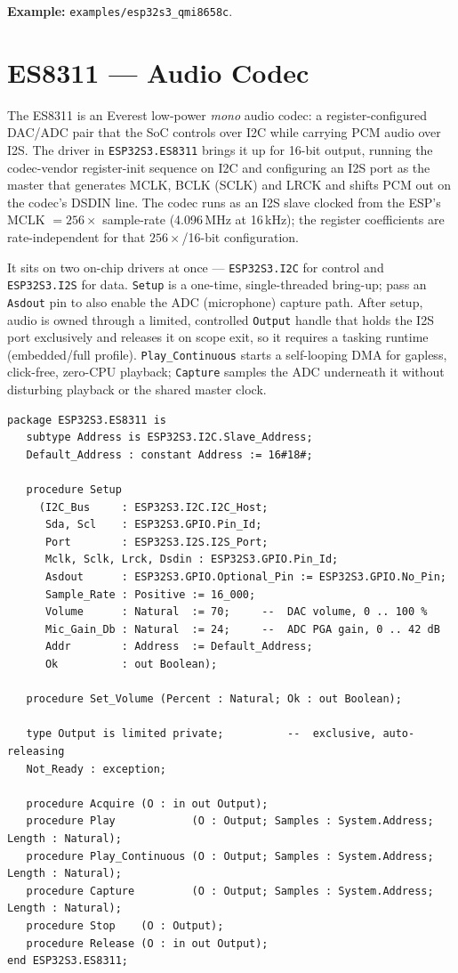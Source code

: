 \noindent\textbf{Example:} \texttt{examples/esp32s3\_qmi8658c}.

\section{ES8311 --- Audio Codec}
\label{app:ext:es8311}

The ES8311 is an Everest low-power \emph{mono} audio codec: a register-configured
DAC/ADC pair that the SoC controls over I2C while carrying PCM audio over I2S. The
driver in \texttt{ESP32S3.ES8311} brings it up for 16-bit output, running the
codec-vendor register-init sequence on I2C and configuring an I2S port as the
master that generates MCLK, BCLK (SCLK) and LRCK and shifts PCM out on the codec's
DSDIN line. The codec runs as an I2S slave clocked from the ESP's MCLK $= 256
\times$ sample-rate (4.096\,MHz at 16\,kHz); the register coefficients are
rate-independent for that $256\times$/16-bit configuration.

It sits on two on-chip drivers at once --- \texttt{ESP32S3.I2C} for control and
\texttt{ESP32S3.I2S} for data. \texttt{Setup} is a one-time, single-threaded
bring-up; pass an \texttt{Asdout} pin to also enable the ADC (microphone) capture
path. After setup, audio is owned through a limited, controlled \texttt{Output}
handle that holds the I2S port exclusively and releases it on scope exit, so it
requires a tasking runtime (embedded/full profile). \texttt{Play\_Continuous}
starts a self-looping DMA for gapless, click-free, zero-CPU playback;
\texttt{Capture} samples the ADC underneath it without disturbing playback or the
shared master clock.

\begin{lstlisting}
package ESP32S3.ES8311 is
   subtype Address is ESP32S3.I2C.Slave_Address;
   Default_Address : constant Address := 16#18#;

   procedure Setup
     (I2C_Bus     : ESP32S3.I2C.I2C_Host;
      Sda, Scl    : ESP32S3.GPIO.Pin_Id;
      Port        : ESP32S3.I2S.I2S_Port;
      Mclk, Sclk, Lrck, Dsdin : ESP32S3.GPIO.Pin_Id;
      Asdout      : ESP32S3.GPIO.Optional_Pin := ESP32S3.GPIO.No_Pin;
      Sample_Rate : Positive := 16_000;
      Volume      : Natural  := 70;     --  DAC volume, 0 .. 100 %
      Mic_Gain_Db : Natural  := 24;     --  ADC PGA gain, 0 .. 42 dB
      Addr        : Address  := Default_Address;
      Ok          : out Boolean);

   procedure Set_Volume (Percent : Natural; Ok : out Boolean);

   type Output is limited private;          --  exclusive, auto-releasing
   Not_Ready : exception;

   procedure Acquire (O : in out Output);
   procedure Play            (O : Output; Samples : System.Address; Length : Natural);
   procedure Play_Continuous (O : Output; Samples : System.Address; Length : Natural);
   procedure Capture         (O : Output; Samples : System.Address; Length : Natural);
   procedure Stop    (O : Output);
   procedure Release (O : in out Output);
end ESP32S3.ES8311;
\end{lstlisting}

